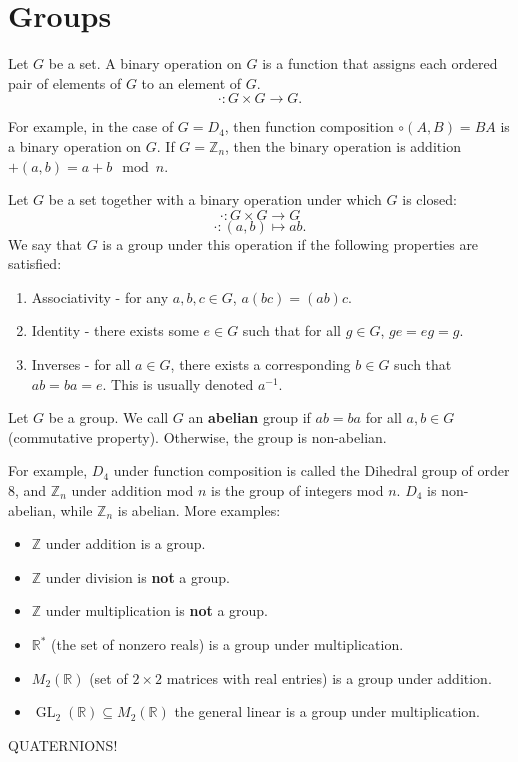 \chapter{Groups}
\begin{definition}\label{dfn:5}
	Let $G$ be a set. A binary operation on $G$ is a function that assigns each ordered pair of elements of $G$ to an element of $G$.
	\[
		\cdot : G\times G\to G
	.\]
\end{definition}
For example, in the case of $G=D_4$, then function composition $\circ (A,B)=BA$ is a binary operation on $G$. If $G=\mathbb{Z}_n$, then the binary operation is addition $+(a,b)=a+b\mod n$.
\begin{definition}[Group]\label{dfn:6}
	Let $G$ be a set together with a binary operation under which $G$ is closed:
	\[
		\cdot : G\times G \to G
	\]
	\[
		\cdot : (a,b) \mapsto ab
	.\]
We say that $G$ is a group under this operation if the following properties are satisfied:
\begin{enumerate}
	\item Associativity - for any $a,b,c\in G$, $a(bc)=(ab)c$.
	\item Identity - there exists some $e\in G$ such that for all $g\in G$, $ge=eg=g$.
	\item Inverses - for all $a\in G$, there exists a corresponding $b\in G$ such that $ab=ba=e$. This is usually denoted $a^{-1}$.
\end{enumerate}
\end{definition}
\begin{definition}\label{dfn:7}
	Let $G$ be a group. We call $G$ an \textbf{abelian} group if $ab=ba$ for all $a,b\in G$ (commutative property). Otherwise, the group is non-abelian.
\end{definition}

For example, $D_4$ under function composition is called the Dihedral group of order 8, and $\mathbb{Z}_n$ under addition mod $n$ is the group of integers mod $n$. $D_4$ is non-abelian, while $\mathbb{Z}_n$ is abelian. More examples:
\begin{itemize}
	\item $\mathbb{Z}$ under addition is a group.
	\item $\mathbb{Z}$ under division is \textbf{not} a group.
	\item $\mathbb{Z}$ under multiplication is \textbf{not} a group.
	\item $\mathbb{R}^*$ (the set of nonzero reals) is a group under multiplication.
	\item $M_2(\mathbb{R})$ (set of $2\times 2$ matrices with real entries) is a group under addition.
	\item $\operatorname{GL}_2(\mathbb{R})\subseteq M_2(\mathbb{R}) $ the general linear is a group under multiplication.
\end{itemize}
QUATERNIONS!

